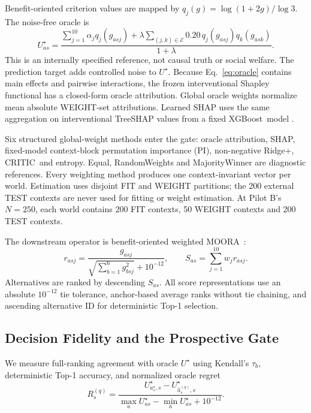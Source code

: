 \documentclass[runningheads]{llncs}
\newcommand{\XGB}{XGBoost}
\newcommand{\MOORA}{MOORA}
\newcommand{\CRITIC}{CRITIC}
\begin{document}
Benefit-oriented criterion values are mapped by
$q_j(g)=\log(1+2g)/\log 3$. The noise-free oracle is
\begin{equation}
U_{as}^{\star}
=\frac{\sum_{j=1}^{10}\alpha_jq_j(g_{asj})
+\lambda\sum_{(j,k)\in\mathcal E}0.20\,q_j(g_{asj})q_k(g_{ask})}
{1+\lambda}.
\label{eq:oracle}
\end{equation}
This is an internally specified reference, not causal truth or social welfare. The prediction
target adds controlled noise to $U^\star$. Because Eq.~\eqref{eq:oracle} contains main effects
and pairwise interactions, the frozen interventional Shapley functional has a closed-form oracle
attribution. Global oracle weights normalize mean absolute WEIGHT-set attributions. Learned SHAP
uses the same aggregation on interventional TreeSHAP values from a fixed \XGB\ model
\cite{chen2016xgboost,lundberg2020trees}.

Six structured global-weight methods enter the gate: oracle attribution, SHAP, fixed-model
context-block permutation importance (PI), non-negative Ridge+, \CRITIC\ and entropy. Equal,
RandomWeights and MajorityWinner are diagnostic references. Every weighting method produces one
context-invariant vector per world. Estimation uses disjoint FIT and WEIGHT partitions; the 200
external TEST contexts are never used for fitting or weight estimation. At Pilot B's
$N=250$, each world contains 200 FIT contexts, 50 WEIGHT contexts and 200 TEST contexts.

The downstream operator is benefit-oriented weighted \MOORA\ \cite{brauers2006moora}:
\begin{equation}
r_{asj}=\frac{g_{asj}}{\sqrt{\sum_{b=1}^{6}g_{bsj}^2}+10^{-12}},
\qquad
S_{as}=\sum_{j=1}^{10}w_jr_{asj}.
\label{eq:moora}
\end{equation}
Alternatives are ranked by descending $S_{as}$. All score representations use an absolute
$10^{-12}$ tie tolerance, anchor-based average ranks without tie chaining, and ascending
alternative ID for deterministic Top-1 selection.

\subsection{Decision Fidelity and the Prospective Gate}

We measure full-ranking agreement with oracle $U^\star$ using Kendall's $\tau_b$, deterministic
Top-1 accuracy, and normalized oracle regret
\begin{equation}
R_s^{(q)}=
\frac{U_{a_s^\star,s}^{\star}-U_{\hat a_s^{(q)},s}^{\star}}
{\max_aU_{as}^{\star}-\min_aU_{as}^{\star}+10^{-12}}.
\label{eq:regret}
\end{equation}
\end{document}
